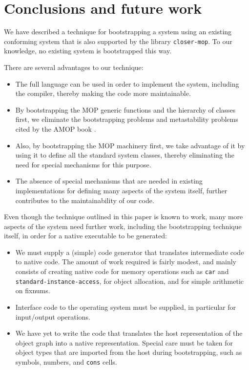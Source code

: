 \section{Conclusions and future work}

We have described a technique for bootstrapping a \commonlisp{} system
using an existing conforming \commonlisp{} system that is also
supported by the library \texttt{closer-mop}.  To our knowledge, no
existing \commonlisp{} system is bootstrapped this way.

There are several advantages to our technique:

\begin{itemize}
\item The full \commonlisp{} language can be used in order to
  implement the system, including the compiler, thereby making the
  code more maintainable.
\item By bootstrapping the MOP generic functions and the hierarchy of
  classes first, we eliminate the bootstrapping problems and
  metastability problems cited by the AMOP book
  \cite{Kiczales:1991:AMP:574212}.
\item Also, by bootstrapping the MOP machinery first, we take advantage
  of it by using it to define all the standard system classes, thereby
  eliminating the need for special mechanisms for this purpose.
\item The absence of special mechanisms that are needed in existing
  implementations for defining many aspects of the system itself,
  further contributes to the maintainability of our code.
\end{itemize}

Even though the technique outlined in this paper is known to work,
many more aspects of the system need further work, including the
bootstrapping technique itself, in order for a native executable to be
generated:

\begin{itemize}
\item We must supply a (simple) code generator that translates
  intermediate code to native code.  The amount of work required is
  fairly modest, and mainly consists of creating native code for
  memory operations such as \texttt{car} and
  \texttt{standard-instance-access}, for object allocation, and for
  simple arithmetic on fixnums.
\item Interface code to the operating system must be supplied, in
  particular for input/output operations.
\item We have yet to write the code that translates the host
  representation of the object graph into a native representation.
  Special care must be taken for object types that are imported from
  the host during bootstrapping, such as symbols, numbers, and
  \texttt{cons} cells.
\end{itemize}

